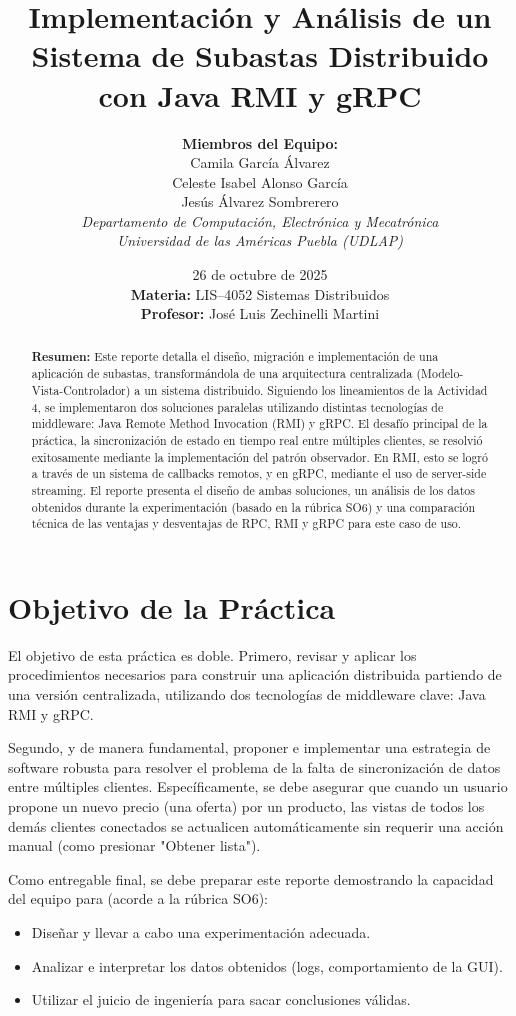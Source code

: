 \documentclass[11pt, a4paper]{article}
\title{Implementación y Análisis de un Sistema de Subastas Distribuido con Java RMI y gRPC}
\author{
  \textbf{Miembros del Equipo:}\\
  Camila García Álvarez\\
  Celeste Isabel Alonso García\\
  Jesús Álvarez Sombrerero
  \vspace{1em} \\
  \textit{Departamento de Computación, Electrónica y Mecatrónica}\\
  \textit{Universidad de las Américas Puebla (UDLAP)}
}
\date{26 de octubre de 2025 \\ \vspace{1em}
    \textbf{Materia:} LIS–4052 Sistemas Distribuidos \\
    \textbf{Profesor:} José Luis Zechinelli Martini
}
\begin{document}
\maketitle
\thispagestyle{empty} %

\begin{abstract}
\textbf{Resumen:} Este reporte detalla el diseño, migración e implementación de una aplicación de subastas, transformándola de una arquitectura centralizada (Modelo-Vista-Controlador) a un sistema distribuido. Siguiendo los lineamientos de la Actividad 4, se implementaron dos soluciones paralelas utilizando distintas tecnologías de middleware: Java Remote Method Invocation (RMI) y gRPC. El desafío principal de la práctica, la sincronización de estado en tiempo real entre múltiples clientes, se resolvió exitosamente mediante la implementación del patrón observador. En RMI, esto se logró a través de un sistema de callbacks remotos, y en gRPC, mediante el uso de server-side streaming. El reporte presenta el diseño de ambas soluciones, un análisis de los datos obtenidos durante la experimentación (basado en la rúbrica SO6) y una comparación técnica de las ventajas y desventajas de RPC, RMI y gRPC para este caso de uso.
\end{abstract}

\newpage
\tableofcontents %
\newpage

\section{Objetivo de la Práctica}
\label{sec:objetivo}

El objetivo de esta práctica es doble. Primero, revisar y aplicar los procedimientos necesarios para construir una aplicación distribuida partiendo de una versión centralizada, utilizando dos tecnologías de middleware clave: Java RMI y gRPC.

Segundo, y de manera fundamental, proponer e implementar una estrategia de software robusta para resolver el problema de la falta de sincronización de datos entre múltiples clientes. Específicamente, se debe asegurar que cuando un usuario propone un nuevo precio (una oferta) por un producto, las vistas de todos los demás clientes conectados se actualicen automáticamente sin requerir una acción manual (como presionar "Obtener lista").

Como entregable final, se debe preparar este reporte demostrando la capacidad del equipo para (acorde a la rúbrica SO6):
\begin{itemize}
    \item Diseñar y llevar a cabo una experimentación adecuada.
    \item Analizar e interpretar los datos obtenidos (logs, comportamiento de la GUI).
    \item Utilizar el juicio de ingeniería para sacar conclusiones válidas.
\end{itemize}
\end{document}
